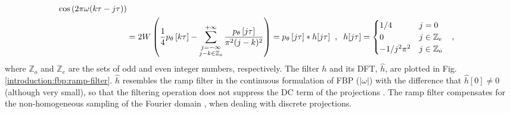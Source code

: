 {\begin{align}
                                   \cos\left( 2\pi \omega (k\tau-j\tau)\right)\nonumber\\
                          &= 2W \left( \frac{1}{4}p_{\theta}\left[k\tau\right] - 
                              \sum\limits_{\substack{j=-\infty\\j-k \in \mathbb{Z}_{o}}}^{+\infty} 
                              \frac{p_{\theta}\left[j\tau\right]}{\pi^{2}(j-k)^{2}}\right)
                            = p_{\theta}\left[j\tau\right] \ast h[j\tau] 
                               \hspace{0.2cm},\hspace{0.2cm} h[j\tau] =\begin{cases}
								    1/4 & j=0 \\
								    0   & j \in \mathbb{Z}_{e}\\
								    -1/j^{2}\pi^{2} & j \in \mathbb{Z}_{o}
                                                                 \end{cases}\hspace{0.3cm},
                                                                 \label{introduction:analytical-reconstruction:filtering-step4}
\end{align}
where $\mathbb{Z}_{o}$ and $\mathbb{Z}_{e}$ are the sets of odd and even integer numbers, respectively.
The filter $h$ and its DFT, $\hat{h}$, are plotted in Fig. \ref{introduction:fbp:ramp-filter}. 
$\hat{h}$ resembles the ramp filter in the continuous formulation of FBP ($|\omega|$) with
the difference that $\hat{h}[0] \neq 0$ (although very small), so that the filtering operation does not suppress
the DC term of the projections \cite{Kak2001}.
\newline
The ramp filter compensates for the non-homogeneous sampling of the Fourier domain \cite{Kak2001}, when dealing with
discrete projections. 
\begin{figure}[!b]
    \hspace{0cm}

\end{figure}}
